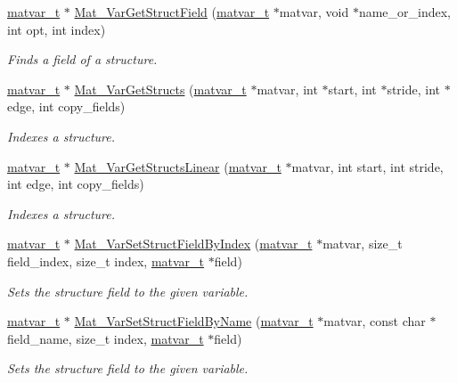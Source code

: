 \begin{DoxyCompactItemize}
\hyperlink{group___m_a_t_structmatvar__t}{matvar\+\_\+t} $\ast$ \hyperlink{group___m_a_t_ga7018bfe6934b96ae32e8f2a1712eefab}{Mat\+\_\+\+Var\+Get\+Struct\+Field} (\hyperlink{group___m_a_t_structmatvar__t}{matvar\+\_\+t} $\ast$matvar, void $\ast$name\+\_\+or\+\_\+index, int opt, int index)
\begin{DoxyCompactList}\small\item\em Finds a field of a structure. \end{DoxyCompactList}\item 
\hyperlink{group___m_a_t_structmatvar__t}{matvar\+\_\+t} $\ast$ \hyperlink{group___m_a_t_ga509178d7dc15faf9f7cd0440df6009b9}{Mat\+\_\+\+Var\+Get\+Structs} (\hyperlink{group___m_a_t_structmatvar__t}{matvar\+\_\+t} $\ast$matvar, int $\ast$start, int $\ast$stride, int $\ast$edge, int copy\+\_\+fields)
\begin{DoxyCompactList}\small\item\em Indexes a structure. \end{DoxyCompactList}\item 
\hyperlink{group___m_a_t_structmatvar__t}{matvar\+\_\+t} $\ast$ \hyperlink{group___m_a_t_gaa56680fb7b2cd3d410f659e945da8141}{Mat\+\_\+\+Var\+Get\+Structs\+Linear} (\hyperlink{group___m_a_t_structmatvar__t}{matvar\+\_\+t} $\ast$matvar, int start, int stride, int edge, int copy\+\_\+fields)
\begin{DoxyCompactList}\small\item\em Indexes a structure. \end{DoxyCompactList}\item 
\hyperlink{group___m_a_t_structmatvar__t}{matvar\+\_\+t} $\ast$ \hyperlink{group___m_a_t_ga3f077a005a8521c7a78927c1a1b4ae45}{Mat\+\_\+\+Var\+Set\+Struct\+Field\+By\+Index} (\hyperlink{group___m_a_t_structmatvar__t}{matvar\+\_\+t} $\ast$matvar, size\+\_\+t field\+\_\+index, size\+\_\+t index, \hyperlink{group___m_a_t_structmatvar__t}{matvar\+\_\+t} $\ast$field)
\begin{DoxyCompactList}\small\item\em Sets the structure field to the given variable. \end{DoxyCompactList}\item 
\hyperlink{group___m_a_t_structmatvar__t}{matvar\+\_\+t} $\ast$ \hyperlink{group___m_a_t_ga702f2b853c605c94a8af50555fc7183b}{Mat\+\_\+\+Var\+Set\+Struct\+Field\+By\+Name} (\hyperlink{group___m_a_t_structmatvar__t}{matvar\+\_\+t} $\ast$matvar, const char $\ast$field\+\_\+name, size\+\_\+t index, \hyperlink{group___m_a_t_structmatvar__t}{matvar\+\_\+t} $\ast$field)
\begin{DoxyCompactList}\small\item\em Sets the structure field to the given variable. \end{DoxyCompactList}\end{DoxyCompactItemize}


